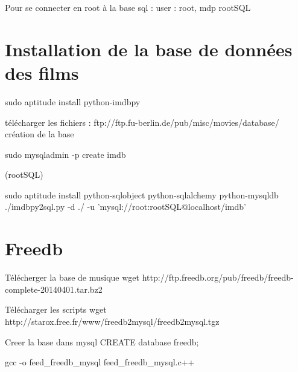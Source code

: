\documentclass[10pt]{article}
\begin{document}
Pour se connecter en root à la base sql : 
user : root, mdp rootSQL


\section{Installation de la base de données des films}
sudo aptitude install python-imdbpy

télécharger les fichiers : ftp://ftp.fu-berlin.de/pub/misc/movies/database/
création de la base

sudo mysqladmin -p create imdb

(rootSQL)

sudo aptitude install python-sqlobject python-sqlalchemy python-mysqldb
./imdbpy2sql.py -d ./ -u 'mysql://root:rootSQL@localhost/imdb'



\section{Freedb}
Télécherger la base de musique
 wget http://ftp.freedb.org/pub/freedb/freedb-complete-20140401.tar.bz2

 
  Télécharger les scripts
   wget http://starox.free.fr/www/freedb2mysql/freedb2mysql.tgz

Creer la base dans mysql
CREATE database freedb;

gcc -o feed_freedb_mysql feed_freedb_mysql.c++

 
\begin{thebibliography}{2}
\end{thebibliography}
\end{document}
